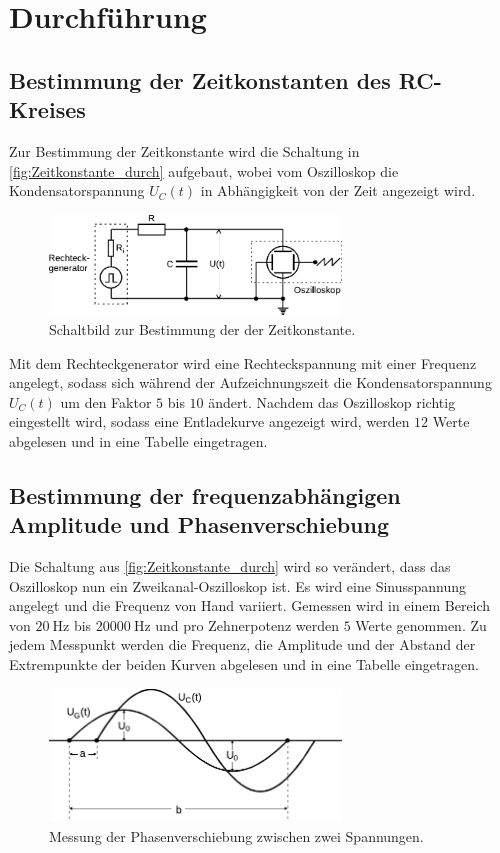 \section{Durchführung}
\label{sec:Durchführung}

\subsection{Bestimmung der Zeitkonstanten des RC-Kreises} %
\label{sub:Zeitkonstante_durch}
Zur Bestimmung der Zeitkonstante wird die Schaltung in \autoref{fig:Zeitkonstante_durch} aufgebaut,
wobei vom Oszilloskop die Kondensatorspannung $U_C(t)$ in Abhängigkeit von der Zeit angezeigt wird.
\begin{figure}[H]
    \centering
    \includegraphics[width=0.69\textwidth]{build/Abb_3.pdf}
    \caption{Schaltbild zur Bestimmung der der Zeitkonstante.\cite{v353}}
    \label{fig:Zeitkonstante_durch}
\end{figure}
\noindent Mit dem Rechteckgenerator wird eine Rechteckspannung mit einer Frequenz angelegt, sodass sich während der Aufzeichnungszeit die Kondensatorspannung $U_C(t)$ um den Faktor $5$ bis $10$ ändert.
Nachdem das Oszilloskop richtig eingestellt wird, sodass eine Entladekurve angezeigt wird, werden $12$ Werte abgelesen und in eine Tabelle eingetragen. 
\subsection{Bestimmung der frequenzabhängigen Amplitude und Phasenverschiebung} %
\label{sub:Freque_A&P_durch}
\noindent Die Schaltung aus \autoref{fig:Zeitkonstante_durch} wird so verändert, dass das Oszilloskop nun ein Zweikanal-Oszilloskop ist.
Es wird eine Sinusspannung angelegt und die Frequenz von Hand variiert.
Gemessen wird in einem Bereich von $\qty{20}{\hertz}$ bis $\qty{20000}{\hertz}$ und pro Zehnerpotenz werden $5$ Werte genommen.
Zu jedem Messpunkt werden die Frequenz, die Amplitude und der Abstand der Extrempunkte der beiden Kurven abgelesen und in eine Tabelle eingetragen.
\begin{figure}[H]
    \centering
    \includegraphics[width=0.69\textwidth]{build/Abb_7_edit.pdf}
    \caption {Messung der Phasenverschiebung zwischen zwei Spannungen.\cite{v353}}
    \label{fig:Freque_A&P_durch}
\end{figure}
